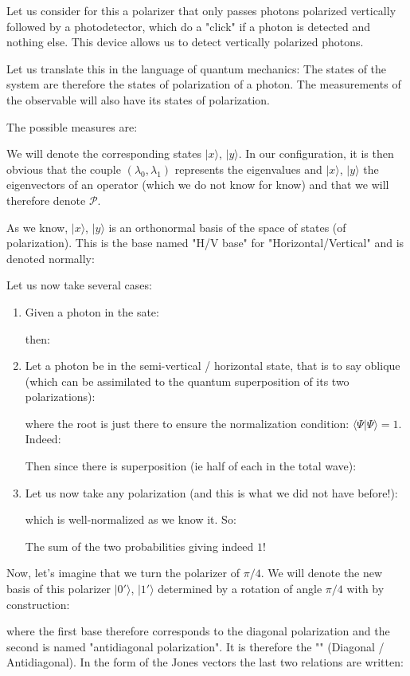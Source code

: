 	Let us consider for this a polarizer that only passes photons polarized vertically followed by a photodetector, which do a "click" if a photon is detected and nothing else. This device allows us to detect vertically polarized photons.

	Let us translate this in the language of quantum mechanics: The states of the system are therefore the states of polarization of a photon. The measurements of the observable will also have its states of polarization.

	The possible measures are:
	
	We will denote the corresponding states $|x\rangle$, $|y\rangle$. In our configuration, it is then obvious that the couple $(\lambda_0,\lambda_1)$ represents the eigenvalues and $|x\rangle$, $|y\rangle$ the eigenvectors of an operator (which we do not know for know) and that we will therefore denote $\mathcal{P}$.

	As we know, $|x\rangle$, $|y\rangle$ is an orthonormal basis of the space of states (of polarization). This is the base named "H/V base" for "Horizontal/Vertical" and is denoted normally:
	
	Let us now take several cases:
	\begin{enumerate}
		\item Given a photon in the sate:
		
		then:
		
	
		\item Let a photon be in the semi-vertical / horizontal state, that is to say oblique (which can be assimilated to the quantum superposition of its two polarizations):
		
		where the root is just there to ensure the normalization condition:  $\langle \Psi|\Psi\rangle=1$. Indeed:
		
		Then since there is superposition (ie half of each in the total wave):
		
		
		\item Let us now take any polarization (and this is what we did not have before!):
		
		which is well-normalized as we know it. So:
		
		The sum of the two probabilities giving indeed $1$!
	\end{enumerate}
	Now, let's imagine that we turn the polarizer of $\pi/4$. We will denote the new basis of this polarizer $|0'\rangle$, $|1'\rangle$ determined by a rotation of angle $\pi/4$ with by construction:
	
	where the first base therefore corresponds to the diagonal polarization and the second is named "antidiagonal polarization". It is therefore the "" (Diagonal / Antidiagonal). In the form of the Jones vectors the last two relations are written:
	
